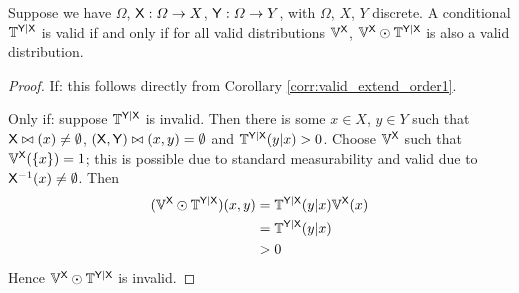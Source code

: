 \begin{theorem}\label{th:valid_conditional_probability}
Suppose we have $\Omega$, $\mathsf{X}:\Omega\to X$, $\mathsf{Y}:\Omega\to Y$, with $\Omega$, $X$, $Y$ discrete. A conditional $\mathbb{T}^{\mathsf{Y}|\mathsf{X}}$ is valid if and only if for all valid distributions $\mathbb{V}^{\mathsf{X}}$, $\mathbb{V}^{\mathsf{X}}\odot \mathbb{T}^{\mathsf{Y}|\mathsf{X}}$ is also a valid distribution.
\end{theorem}

\begin{proof}
If: this follows directly from Corollary \ref{corr:valid_extend_order1}.

Only if: suppose $\mathbb{T}^{\mathsf{Y}|\mathsf{X}}$ is invalid. Then there is some $x\in X$, $y\in Y$ such that $\mathsf{X}\bowtie(x)\neq \emptyset$, $(\mathsf{X},\mathsf{Y})\bowtie(x,y)=\emptyset$ and $\mathbb{T}^{\mathsf{Y}|\mathsf{X}}(y|x)>0$. Choose $\mathbb{V}^{\mathsf{X}}$ such that $\mathbb{V}^{\mathsf{X}}(\{x\})=1$; this is possible due to standard measurability and valid due to $\mathsf{X}^{-1}(x)\neq \emptyset$. Then
\begin{align}
    (\mathbb{V}^{\mathsf{X}}\odot \mathbb{T}^{\mathsf{Y}|\mathsf{X}})(x,y) &= \mathbb{T}^{\mathsf{Y}|\mathsf{X}}(y|x) \mathbb{V}^{\mathsf{X}}(x)\\
                                                                     &= \mathbb{T}^{\mathsf{Y}|\mathsf{X}}(y|x)\\
                                                                     &>0
\end{align}
Hence $\mathbb{V}^{\mathsf{X}}\odot \mathbb{T}^{\mathsf{Y}|\mathsf{X}}$ is invalid.
\end{proof}


